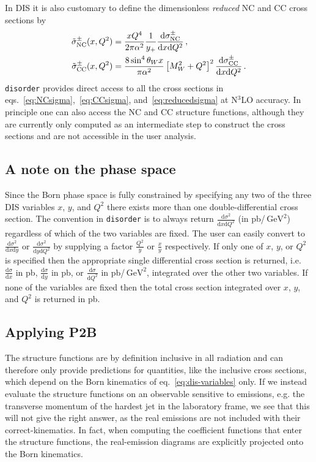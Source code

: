 \documentclass[submission, PhysCodeb]{SciPost_better_arXiv}
\newcommand{\disorder}{{\tt disorder}}
\newcommand{\dd}{\mathrm{d}}
\newcommand{\NC}{\mathrm{NC}}
\newcommand{\CC}{\mathrm{CC}}
\newcommand{\GEV}{\,\mathrm{GeV}}
\newcommand{\NNNLO}{N$^3$LO}
\begin{document}
In DIS it is also customary to define the dimensionless
\emph{reduced} NC and CC cross sections by~\cite{H1:2012qti}
\begin{align}
  \label{eq:reducedsigma}
  \tilde{\sigma}_\NC^\pm(x,Q^2) &= \frac{xQ^4}{2\pi\alpha^2}\frac{1}{y_+}\frac{\dd\sigma_{\NC}^\pm}{\dd x \dd Q^2}\,, \notag \\
  \tilde{\sigma}_\CC^\pm(x,Q^2) &= \frac{8\sin^4\theta_W x}{\pi\alpha^2}\left[M_W^2+Q^2\right]^2\frac{\dd\sigma_{\CC}^\pm}{\dd x \dd Q^2}\,.
\end{align}
\disorder{} provides direct access to all the cross sections in
eqs.~\eqref{eq:NCsigma},~\eqref{eq:CCsigma},
and~\eqref{eq:reducedsigma} at \NNNLO{} accuracy. In principle one can
also access the NC and CC structure functions, although they are
currently only computed as an intermediate step to construct the cross
sections and are not accessible in the user analysis.

\subsection{A note on the phase space}
\label{sec:phasespace}
Since the Born phase space is fully constrained by specifying any two
of the three DIS variables $x$, $y$, and $Q^2$ there exists more than
one double-differential cross section. The convention in \disorder{}
is to always return $\frac{\dd\sigma^2}{\dd x \dd Q^2}$ (in
pb/$\GEV^2$) regardless of which of the two variables are fixed. The
user can easily convert to $\frac{\dd\sigma^2}{\dd x \dd y}$ or
$\frac{\dd\sigma^2}{\dd y \dd Q^2}$ by supplying a factor
$\frac{Q^2}{y}$ or $\frac{x}{y}$ respectively. If only one of $x$,
$y$, or $Q^2$ is specified then the appropriate single differential
cross section is returned, i.e.~$\frac{\dd\sigma}{\dd x}$ in pb,
$\frac{\dd\sigma}{\dd y}$ in pb, or $\frac{\dd\sigma}{\dd Q^2}$ in
pb/$\GEV^2$, integrated over the other two variables. If none of the
variables are fixed then the total cross section integrated over $x$,
$y$, and $Q^2$ is returned in pb.

\subsection{Applying P2B}
\label{sec:P2B}
The structure functions are by definition inclusive in all radiation
and can therefore only provide predictions for quantities, like the
inclusive cross sections, which depend on the Born kinematics of
eq.~\eqref{eq:dis-variables} only. If we instead evaluate the
structure functions on an observable sensitive to emissions, e.g. the
transverse momentum of the hardest jet in the laboratory frame, we see
that this will not give the right answer, as the real emissions are
not included with their correct-kinematics. In fact, when computing
the coefficient functions that enter the structure functions, the
real-emission diagrams are explicitly projected onto the Born
kinematics.
\end{document}
